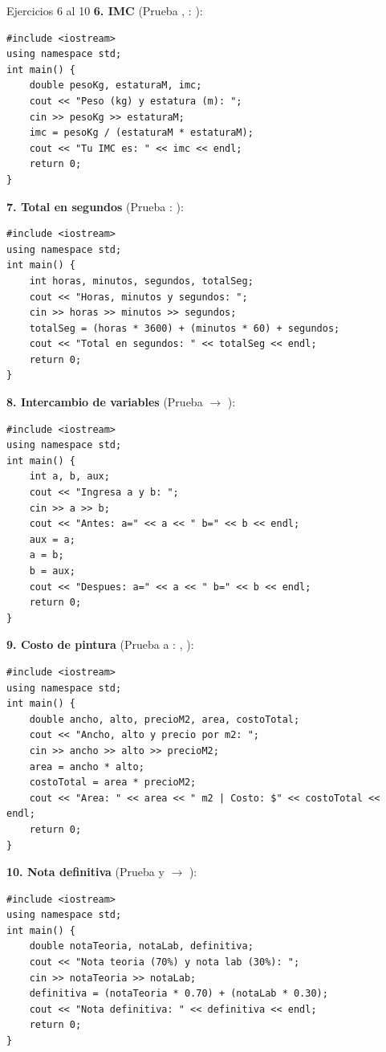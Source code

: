 \documentclass[11pt,letterpaper]{article}
\begin{document}
\begin{solucion}{Ejercicios 6 al 10}
\textbf{6. IMC} (Prueba , : ):
\begin{lstlisting}[style=cppmonitoria]
#include <iostream>
using namespace std;
int main() {
    double pesoKg, estaturaM, imc;
    cout << "Peso (kg) y estatura (m): ";
    cin >> pesoKg >> estaturaM;
    imc = pesoKg / (estaturaM * estaturaM);
    cout << "Tu IMC es: " << imc << endl;
    return 0;
}
\end{lstlisting}

\textbf{7. Total en segundos} (Prueba : ):
\begin{lstlisting}[style=cppmonitoria]
#include <iostream>
using namespace std;
int main() {
    int horas, minutos, segundos, totalSeg;
    cout << "Horas, minutos y segundos: ";
    cin >> horas >> minutos >> segundos;
    totalSeg = (horas * 3600) + (minutos * 60) + segundos;
    cout << "Total en segundos: " << totalSeg << endl;
    return 0;
}
\end{lstlisting}

\textbf{8. Intercambio de variables} (Prueba  $\rightarrow$ ):
\begin{lstlisting}[style=cppmonitoria]
#include <iostream>
using namespace std;
int main() {
    int a, b, aux;
    cout << "Ingresa a y b: ";
    cin >> a >> b;
    cout << "Antes: a=" << a << " b=" << b << endl;
    aux = a;
    a = b;
    b = aux;
    cout << "Despues: a=" << a << " b=" << b << endl;
    return 0;
}
\end{lstlisting}

\textbf{9. Costo de pintura} (Prueba  a : , ):
\begin{lstlisting}[style=cppmonitoria]
#include <iostream>
using namespace std;
int main() {
    double ancho, alto, precioM2, area, costoTotal;
    cout << "Ancho, alto y precio por m2: ";
    cin >> ancho >> alto >> precioM2;
    area = ancho * alto;
    costoTotal = area * precioM2;
    cout << "Area: " << area << " m2 | Costo: $" << costoTotal << endl;
    return 0;
}
\end{lstlisting}

\textbf{10. Nota definitiva} (Prueba  y  $\rightarrow$ ):
\begin{lstlisting}[style=cppmonitoria]
#include <iostream>
using namespace std;
int main() {
    double notaTeoria, notaLab, definitiva;
    cout << "Nota teoria (70%) y nota lab (30%): ";
    cin >> notaTeoria >> notaLab;
    definitiva = (notaTeoria * 0.70) + (notaLab * 0.30);
    cout << "Nota definitiva: " << definitiva << endl;
    return 0;
}
\end{lstlisting}
\end{solucion}
\end{document}
